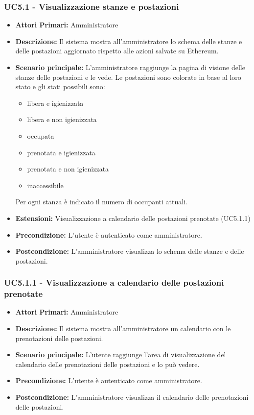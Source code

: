 \subsubsection{ UC5.1 - Visualizzazione stanze e postazioni}
\begin{itemize}
	\item\textbf{Attori Primari:}
	Amministratore
	\item\textbf{Descrizione:}
	Il sistema mostra all'amministratore lo schema delle stanze e delle postazioni aggiornato rispetto alle azioni salvate su Ethereum.
	\item\textbf{Scenario principale:}
	L'amministratore raggiunge la pagina di visione delle stanze delle postazioni e le vede. Le postazioni sono colorate in base al loro stato e gli stati possibili sono:
	\begin{itemize}
		\item{libera e igienizzata}
		\item{libera e non igienizzata}
		\item{occupata}
		\item{prenotata e igienizzata}
		\item{prenotata e non igienizzata}
		\item{inaccessibile}
	\end{itemize}
	Per ogni stanza è indicato il numero di occupanti attuali.
	\item\textbf{Estensioni:}
	Visualizzazione a calendario delle postazioni prenotate (UC5.1.1)
	\item\textbf{Precondizione:} 
	L'utente è autenticato come amministratore.
	\item\textbf{Postcondizione:}
	L'amministratore visualizza lo schema delle stanze e delle postazioni.
\end{itemize}

\subsubsection{ UC5.1.1 - Visualizzazione a calendario delle postazioni prenotate}
\begin{itemize}
	\item\textbf{Attori Primari:}
	Amministratore
	\item\textbf{Descrizione:}
	Il sistema mostra all'amministratore un calendario con le prenotazioni delle postazioni.
	\item\textbf{Scenario principale:}
	L'utente raggiunge l'area di visualizzazione del calendario delle prenotazioni delle postazioni e lo può vedere.
	\item\textbf{Precondizione:} 
	L'utente è autenticato come amministratore.
	\item\textbf{Postcondizione:}
	L'amministratore visualizza il calendario delle prenotazioni delle postazioni.
\end{itemize}


